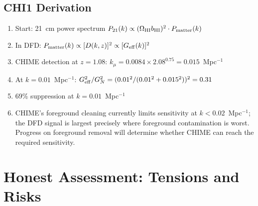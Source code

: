 \documentclass[11pt,a4paper]{article}
\begin{document}
\subsection{CHI1 Derivation}

\begin{enumerate}[nosep]
\item Start: 21~cm power spectrum $P_{21}(k) \propto
  (\Omega_{\rm HI} b_{\rm HI})^2 \cdot P_{\rm matter}(k)$
\item In DFD: $P_{\rm matter}(k) \propto [D(k,z)]^2 \propto
  [G_{\rm eff}(k)]^2$
\item CHIME detection at $z = 1.08$: $k_\mu = 0.0084 \times 2.08^{0.75}
  = 0.015$~Mpc$^{-1}$
\item At $k = 0.01$~Mpc$^{-1}$: $G_{\rm eff}^2/G_N^2 =
  (0.01^2/(0.01^2 + 0.015^2))^2 = 0.31$
\item 69\% suppression at $k = 0.01$~Mpc$^{-1}$
\item CHIME's foreground cleaning currently limits sensitivity at
  $k < 0.02$~Mpc$^{-1}$; the DFD signal is largest precisely where
  foreground contamination is worst. Progress on foreground removal will
  determine whether CHIME can reach the required sensitivity.
\end{enumerate}

\section{Honest Assessment: Tensions and Risks}
\label{sec:risks}
\end{document}
